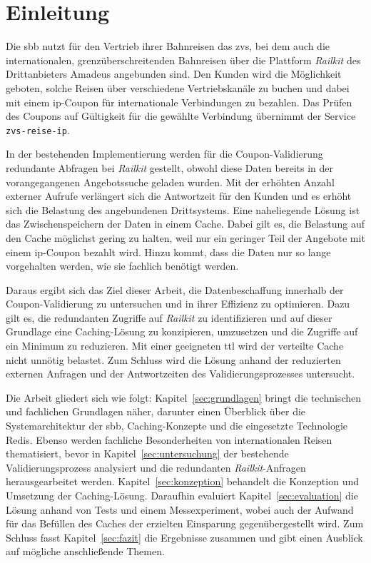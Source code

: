 \section{Einleitung}
\label{sec:einleitung}

Die \ac{sbb} nutzt für den Vertrieb ihrer Bahnreisen das \ac{zvs}, bei dem auch die internationalen, grenzüberschreitenden Bahnreisen über die Plattform \textit{Railkit} des Drittanbieters Amadeus angebunden sind. Den Kunden wird die Möglichkeit geboten, solche Reisen über verschiedene Vertriebskanäle zu buchen und dabei mit einem \ac{ip}-Coupon für internationale Verbindungen zu bezahlen. Das Prüfen des Coupons auf Gültigkeit für die gewählte Verbindung übernimmt der Service \texttt{zvs-reise-ip}.

In der bestehenden Implementierung werden für die Coupon-Validierung redundante Abfragen bei \textit{Railkit} gestellt, obwohl diese Daten bereits in der vorangegangenen Angebotssuche geladen wurden. Mit der erhöhten Anzahl externer Aufrufe verlängert sich die Antwortzeit für den Kunden und es erhöht sich die Belastung des angebundenen Drittsystems. Eine naheliegende Lösung ist das Zwischenspeichern der Daten in einem Cache. Dabei gilt es, die Belastung auf den Cache möglichst gering zu halten, weil nur ein geringer Teil der Angebote mit einem \ac{ip}-Coupon bezahlt wird. Hinzu kommt, dass die Daten nur so lange vorgehalten werden, wie sie fachlich benötigt werden.

Daraus ergibt sich das Ziel dieser Arbeit, die Datenbeschaffung innerhalb der Coupon-Validierung zu untersuchen und in ihrer Effizienz zu optimieren. Dazu gilt es, die redundanten Zugriffe auf \textit{Railkit} zu identifizieren und auf dieser Grundlage eine Caching-Lösung zu konzipieren, umzusetzen und die Zugriffe auf ein Minimum zu reduzieren. Mit einer geeigneten \ac{ttl} wird der verteilte Cache nicht unnötig belastet. Zum Schluss wird die Lösung anhand der reduzierten externen Anfragen und der Antwortzeiten des Validierungsprozesses untersucht.

Die Arbeit gliedert sich wie folgt: Kapitel~\ref{sec:grundlagen} bringt die technischen und fachlichen Grundlagen näher, darunter einen Überblick über die Systemarchitektur der \ac{sbb}, Caching-Konzepte und die eingesetzte Technologie Redis. Ebenso werden fachliche Besonderheiten von internationalen Reisen thematisiert, bevor in Kapitel~\ref{sec:untersuchung} der bestehende Validierungsprozess analysiert und die redundanten \textit{Railkit}-Anfragen herausgearbeitet werden. Kapitel~\ref{sec:konzeption} behandelt die Konzeption und Umsetzung der Caching-Lösung. Daraufhin evaluiert Kapitel~\ref{sec:evaluation} die Lösung anhand von Tests und einem Messexperiment, wobei auch der Aufwand für das Befüllen des Caches der erzielten Einsparung gegenübergestellt wird. Zum Schluss fasst Kapitel~\ref{sec:fazit} die Ergebnisse zusammen und gibt einen Ausblick auf mögliche anschließende Themen.